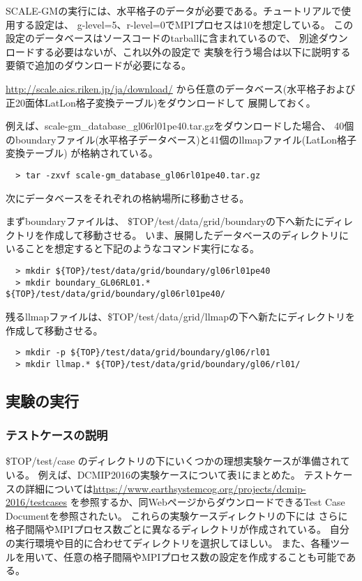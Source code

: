 SCALE-GMの実行には、水平格子のデータが必要である。チュートリアルで使用する設定は、
g-level=5、r-level=0でMPIプロセスは10を想定している。
この設定のデータベースはソースコードのtarballに含まれているので、
別途ダウンロードする必要はないが、これ以外の設定で
実験を行う場合は以下に説明する要領で追加のダウンロードが必要になる。

\noindent \url{http://scale.aics.riken.jp/ja/download/}
から任意のデータベース(水平格子および正20面体LatLon格子変換テーブル)をダウンロードして
展開しておく。

\noindent 例えば、scale-gm\_database\_gl06rl01pe40.tar.gzをダウンロードした場合、
40個のboundaryファイル(水平格子データベース)と41個のllmapファイル(LatLon格子変換テーブル)
が格納されている。
\begin{verbatim}
  > tar -zxvf scale-gm_database_gl06rl01pe40.tar.gz
\end{verbatim}


\noindent 次にデータベースをそれぞれの格納場所に移動させる。

\noindent まずboundaryファイルは、
\${TOP}/test/data/grid/boundaryの下へ新たにディレクトリを作成して移動させる。
いま、展開したデータベースのディレクトリにいることを想定すると下記のようなコマンド実行になる。

\begin{verbatim}
  > mkdir ${TOP}/test/data/grid/boundary/gl06rl01pe40
  > mkdir boundary_GL06RL01.* ${TOP}/test/data/grid/boundary/gl06rl01pe40/
\end{verbatim}

\noindent 残るllmapファイルは、\${TOP}/test/data/grid/llmapの下へ新たにディレクトリを作成して移動させる。

\begin{verbatim}
  > mkdir -p ${TOP}/test/data/grid/boundary/gl06/rl01
  > mkdir llmap.* ${TOP}/test/data/grid/boundary/gl06/rl01/
\end{verbatim}


\subsection{実験の実行}
\subsubsection{テストケースの説明}

\noindent \${TOP}/test/case のディレクトリの下にいくつかの理想実験ケースが準備されている。
例えば、DCMIP2016の実験ケースについて表1にまとめた。
テストケースの詳細については\url{https://www.earthsystemcog.org/projects/dcmip-2016/testcases}
を参照するか、同WebページからダウンロードできるTest Case Documentを参照されたい。
これらの実験ケースディレクトリの下には
さらに格子間隔やMPIプロセス数ごとに異なるディレクトリが作成されている。
自分の実行環境や目的に合わせてディレクトリを選択してほしい。
また、各種ツールを用いて、任意の格子間隔やMPIプロセス数の設定を作成することも可能である。

